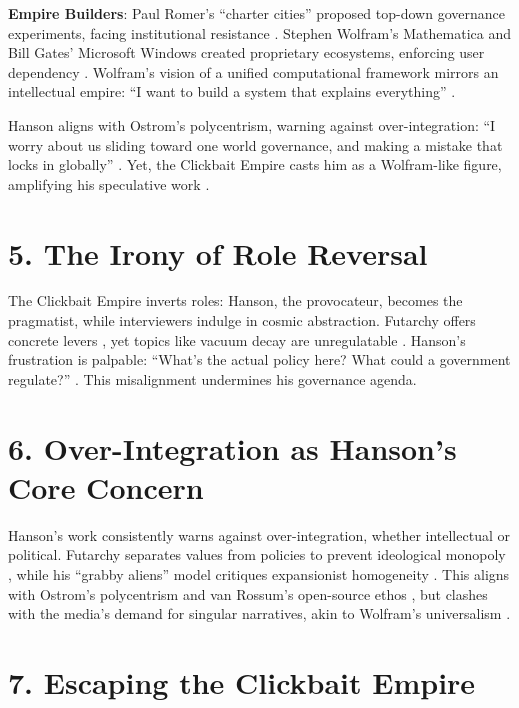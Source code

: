 \documentclass[12pt]{article}
\begin{document}
\textbf{Empire Builders}: Paul Romer’s ``charter cities'' proposed top-down governance experiments, facing institutional resistance \citep{romer2010}. Stephen Wolfram’s Mathematica and Bill Gates’ Microsoft Windows created proprietary ecosystems, enforcing user dependency \citep{wolfram2002,gates1995}. Wolfram’s vision of a unified computational framework mirrors an intellectual empire: ``I want to build a system that explains everything'' \citep{wolfram2002}.

Hanson aligns with Ostrom’s polycentrism, warning against over-integration: ``I worry about us sliding toward one world governance, and making a mistake that locks in globally'' \citep{lunar2024}. Yet, the Clickbait Empire casts him as a Wolfram-like figure, amplifying his speculative work \citep{hanson2021,bbc2021}.

\section*{5. The Irony of Role Reversal}

The Clickbait Empire inverts roles: Hanson, the provocateur, becomes the pragmatist, while interviewers indulge in cosmic abstraction. Futarchy offers concrete levers \citep{hanson2001}, yet topics like vacuum decay are unregulatable \citep{lunar2024}. Hanson’s frustration is palpable: ``What’s the actual policy here? What could a government regulate?'' \citep{lunar2024}. This misalignment undermines his governance agenda.

\section*{6. Over-Integration as Hanson’s Core Concern}

Hanson’s work consistently warns against over-integration, whether intellectual or political. Futarchy separates values from policies to prevent ideological monopoly \citep{hanson2001}, while his ``grabby aliens'' model critiques expansionist homogeneity \citep{hanson2021}. This aligns with Ostrom’s polycentrism \citep{ostrom1990} and van Rossum’s open-source ethos \citep{vanrossum1991}, but clashes with the media’s demand for singular narratives, akin to Wolfram’s universalism \citep{wolfram2002}.

\section*{7. Escaping the Clickbait Empire}
\end{document}
